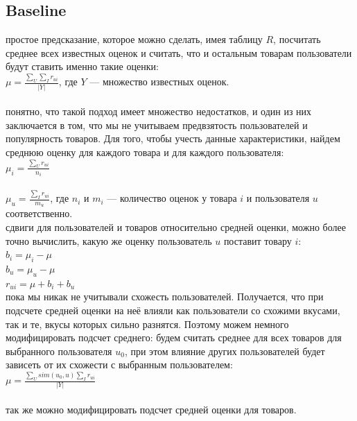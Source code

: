 \documentclass{article}
\newcommand\tab[1][1cm]{\hspace*{#1}}
\begin{document}
\subsection{Baseline}
 простое предсказание, которое можно сделать, имея таблицу ﻿$R$﻿, посчитать среднее всех известных оценок и считать, что и остальным товарам пользователи будут ставить именно такие оценки:\\
$\mu=\frac{\sum_U{\sum_I{r_{ui}}}}{|Y|}$, где $Y$ — множество известных оценок.\\ 
\\
 понятно, что такой подход имеет множество недостатков, и один из них заключается в том, что мы не учитываем предвзятость пользователей и популярность товаров. Для того, чтобы учесть данные характеристики, найдем среднюю оценку для каждого товара и для каждого пользователя:\\
$\mu_i=\frac{\sum_U{r_{ui}}}{n_i}$\\
\vspace{1.5mm}\\
$\mu_u=\frac{\sum_I{r_{ui}}}{m_u}$, где ${n_i}$ и ${m_i}$ — количество оценок у товара $i$﻿ и пользователя ﻿$u$ соответственно.\\
 сдвиги для пользователей и товаров относительно средней оценки, можно более точно вычислить, какую же оценку пользователь ﻿$u$﻿ поставит товару $i$﻿﻿:\\
$b_i=\mu_i-\mu$\\
$b_u=\mu_u-\mu$\\
$r_{ui}=\mu+b_i+b_u$\\
 пока мы никак не учитывали схожесть пользователей. Получается, что при подсчете средней оценки на неё влияли как пользователи со схожими вкусами, так и те, вкусы которых сильно разнятся. Поэтому можем немного модифицировать подсчет среднего: будем считать среднее для всех товаров для выбранного пользователя ﻿$u_0$, при этом влияние других пользователей будет зависеть от их схожести с выбранным пользователем:\\
$\mu=\frac{\sum_U{sim(u_0,u)}\sum_I{r_{ui}}}{|Y|}$\\
\vspace{1.5mm}\\
 так же можно модифицировать подсчет средней оценки для товаров.
\end{document}
